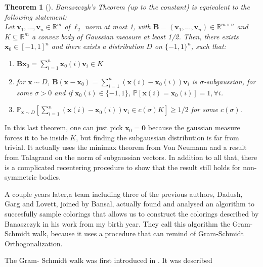 \documentclass[12pt]{article}
\newtheorem{theorem}{Theorem}
\begin{document}
\begin{theorem}[\cite{construct}]
Banaszczyk's Theorem (up to the constant) is equivalent to the following statement:\\
Let $\textbf{v}_1, \dots, \textbf{v}_n \in \mathbb{R}^m$ of $\ell_2$ norm at most 1, with $\textbf{B}= (\textbf{v}_1, \dots, \textbf{v}_n) \in \mathbb{R}^{m \times n}$ and $K \subseteq \mathbb{R}^m$ a convex body  of Gaussian measure at least 1/2.
Then, there exists $\textbf{x}_0 \in [-1,1]^n$ and there exists a distribution $D$ on $\{-1,1\}^n$, such that: 
\begin{enumerate}
    \item  $\textbf{B}\textbf{x}_0 = \sum_{i=1}^n \textbf{x}_0(i)\textbf{v}_i \in K$\\
    \item  for $\textbf{x} \sim D$, $\textbf{B}(\textbf{x}-\textbf{x}_0)= \sum_{i=1}^n (\textbf{x}(i)-\textbf{x}_0(i))\textbf{v}_i$ is $\sigma$-subgaussian, for some $\sigma >0$ and if $\textbf{x}_0(i) \in \{-1, 1\}$, $\mathbb{P}[\textbf{x}(i)=\textbf{x}_0(i)]=1, \forall i$.
    \item $\mathbb{P}_{\textbf{x} \sim D}[\sum_{i=1}^n (\textbf{x}(i)- \textbf{x}_0(i))\textbf{v}_i \in c(\sigma)K] \geq 1/2$ for some $c(\sigma)$.
\end{enumerate}
\end{theorem}
In this last theorem, one can just pick $\textbf{x}_0=\textbf{0}$ because the gaussian measure forces it to be inside $K$, but finding the subgaussian distribution is far from trivial. It actually uses the minimax theorem from Von Neumann \cite{neumann1928theorie} and a result from Talagrand \cite{talagrand2005generic} on the norm of subgaussian vectors. In addition to all that, there is a complicated recentering procedure to show that the result still holds for non-symmetric bodies.

A couple years later,a team including three of the previous authors, Dadush, Garg and Lovett, joined by Bansal, actually found and analysed an algorithm to succesfully sample colorings that allows us to construct the colorings described by Banaszczyk in his work from my birth year. They call this algorithm the Gram-Schmidt walk, because it uses a procedure that can remind of Gram-Schmidt Orthogonalization. 

The Gram- Schmidt walk was first introduced in \cite{blues}. It was described
\end{document}
